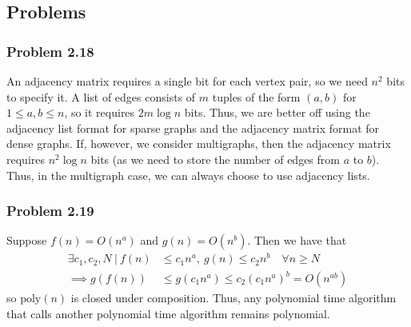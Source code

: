 \subsection{Problems}

\subsubsection{Problem 2.18}
An adjacency matrix requires a single bit for each vertex pair, so we need $n^2$ bits to specify it. A list
of edges consists of  $m$ tuples of the form $(a, b)$ for $1 \leq a, b \leq n$, so it requires $2m\log n$ 
bits. Thus, we are better off using the adjacency list format for sparse graphs and the adjacency matrix 
format for dense graphs. If, however, we consider multigraphs, then the adjacency matrix requires $n^2 \log n$
bits (as we need to store the number of edges from $a$ to $b$). Thus, in the multigraph case, we can always
choose to use adjacency lists.

\subsubsection{Problem 2.19}
Suppose $f(n) = O(n^a)$ and $g(n) = O(n^b)$. Then we have that
\begin{align*}
        \exists c_1, c_2, N \: | \: f(n) &\leq c_1 n^a, \: g(n) \leq c_2 n^b \quad \forall n \geq N\\
        \implies g(f(n)) &\leq g(c_1 n^a) \leq c_2 (c_1 n^a)^b = O(n^{ab})
\end{align*}
so $\text{poly}(n)$ is closed under composition. Thus, any polynomial time algorithm that calls another 
polynomial time algorithm remains polynomial.

